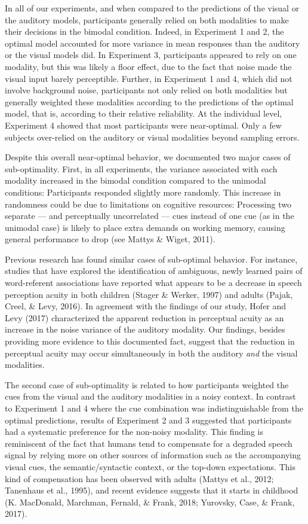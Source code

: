 \documentclass[english,,man,floatsintext]{apa6}
\theoremstyle{definition}
\theoremstyle{definition}
\theoremstyle{definition}
\theoremstyle{remark}
\begin{document}
In all of our experiments, and when compared to the predictions of the
visual or the auditory models, participants generally relied on both
modalities to make their decisions in the bimodal condition. Indeed, in
Experiment 1 and 2, the optimal model accounted for more variance in
mean responses than the auditory or the visual models did. In Experiment
3, participants appeared to rely on one modality, but this was likely a
floor effect, due to the fact that noise made the visual input barely
perceptible. Further, in Experiment 1 and 4, which did not involve
background noise, participants not only relied on both modalities but
generally weighted these modalities according to the predictions of the
optimal model, that is, according to their relative reliability. At the
individual level, Experiment 4 showed that most participants were
near-optimal. Only a few subjects over-relied on the auditory or visual
modalities beyond sampling errors.

Despite this overall near-optimal behavior, we documented two major
cases of sub-optimality. First, in all experiments, the variance
associated with each modality increased in the bimodal condition
compared to the unimodal conditions: Participants responded slightly
more randomly. This increase in randomness could be due to limitations
on cognitive resources: Processing two separate --- and perceptually
uncorrelated --- cues instead of one cue (as in the unimodal case) is
likely to place extra demands on working memory, causing general
performance to drop (see Mattys \& Wiget, 2011).

Previous research has found similar cases of sub-optimal behavior. For
instance, studies that have explored the identification of ambiguous,
newly learned pairs of word-referent associations have reported what
appears to be a decrease in speech perception acuity in both children
(Stager \& Werker, 1997) and adults (Pajak, Creel, \& Levy, 2016). In
agreement with the findings of our study, Hofer and Levy (2017)
characterized the apparent reduction in perceptual acuity as an increase
in the noise variance of the auditory modality. Our findings, besides
providing more evidence to this documented fact, suggest that the
reduction in perceptual acuity may occur simultaneously in both the
auditory \emph{and} the visual modalities.

The second case of sub-optimality is related to how participants
weighted the cues from the visual and the auditory modalities in a noisy
context. In contrast to Experiment 1 and 4 where the cue combination was
indistinguishable from the optimal predictions, results of Experiment 2
and 3 suggested that participants had a systematic preference for the
non-noisy modality. This finding is reminiscent of the fact that humans
tend to compensate for a degraded speech signal by relying more on other
sources of information such as the accompanying visual cues, the
semantic/syntactic context, or the top-down expectations. This kind of
compensation has been observed with adults (Mattys et al., 2012;
Tanenhaus et al., 1995), and recent evidence suggests that it starts in
childhood (K. MacDonald, Marchman, Fernald, \& Frank, 2018; Yurovsky,
Case, \& Frank, 2017).
\end{document}
